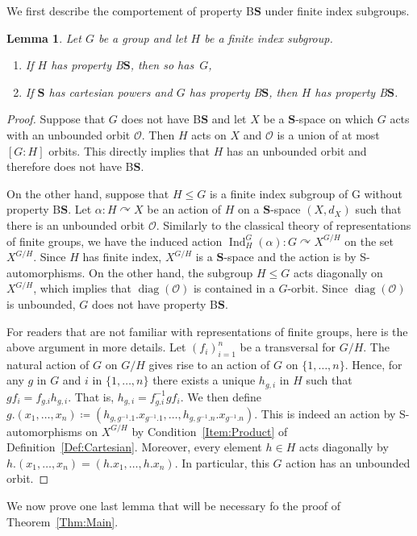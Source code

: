 \documentclass[a4paper]{article}
\newtheorem{lem}{Lemma}[section]
\theoremstyle{definition}
\DeclareMathOperator\Ind{Ind}
\DeclareMathOperator\diag{diag}
\newcommand*{\orbite}{\mathcal O}
\newcommand*{\BS}{B$\mathbf{S}$}
\begin{document}
We first describe the comportement of property \BS{} under finite index subgroups.
%
%
\begin{lem}\label{Lemma:Subgroup}
Let $G$ be a group and let $H$ be a finite index subgroup.
\begin{enumerate}
\item
If $H$ has property \BS, then so has~$G$,
\item
If $\mathbf{S}$ has cartesian powers and $G$ has property \BS, then $H$ has property \BS.
\end{enumerate}
\end{lem}
\begin{proof}
Suppose that $G$ does not have \BS{} and let $X$ be a $\mathbf S$-space on which $G$ acts with an unbounded orbit $\orbite$.
Then $H$ acts on $X$ and $\orbite$ is a union of at most $[G:H]$ orbits. This directly implies that $H$ has an unbounded orbit and therefore does not have \BS.

On the other hand, suppose that $H\leq G$ is a finite index subgroup of G without property \BS.
Let $\alpha\colon H\curvearrowright X$ be an action of $H$ on a $\mathbf S$-space $(X,d_X)$ such that there is an unbounded orbit $\orbite$.
Similarly to the classical theory of representations of finite groups, we have the induced  action $\Ind_H^G(\alpha)\colon G \curvearrowright X^{G/H}$ on the set $X^{G/H}$. Since $H$ has finite index, $X^{G/H}$ is a $\mathbf S$-space and the action is by S-automorphisms. On the other hand, the subgroup $H\leq G$ acts diagonally on $X^{G/H}$, which implies that $\diag(\orbite)$ is contained in a $G$-orbit.
Since $\diag(\orbite)$ is unbounded, $G$ does not have property \BS.

For readers that are not familiar with representations of finite groups, here is the above argument in more details.
Let $(f_i)_{i=1}^n$ be a transversal for $G/H$.
The natural action of $G$ on $G/H$ gives rise to an action of $G$ on $\{1,\dots,n\}$.
Hence, for any $g$ in $G$ and $i$ in $\{1,\dots,n\}$ there exists a unique $h_{g,i}$ in $H$ such that $gf_i=f_{g.i}h_{g,i}$. That is, $h_{g,i}=f_{g.i}^{-1}gf_i$.
We then define $g.(x_1,\dots,x_n)\coloneqq(h_{g,g^{-1}.1}.x_{g^{-1}.1},\dots,h_{g,g^{-1}.n}.x_{g^{-1}.n})$. This is indeed an action by S-automorphisms on $X^{G/H}$ by Condition~\ref{Item:Product} of Definition~\ref{Def:Cartesian}.
Moreover, every element $h\in H$ acts diagonally by $h.(x_1,\dots,x_n)=(h.x_1,\dots,h.x_n)$.
In particular, this $G$ action has an unbounded orbit.
\end{proof}
%
%
We now prove one last lemma that will be necessary fo the proof of Theorem~\ref{Thm:Main}.
\end{document}
